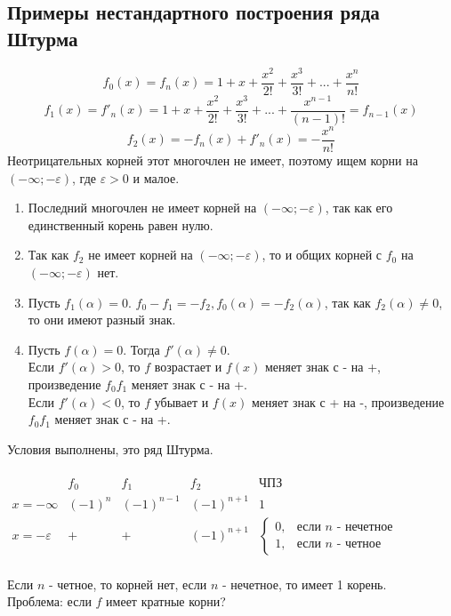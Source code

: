 \documentclass[12pt]{article}
\begin{document}
\subsection{Примеры нестандартного построения ряда Штурма}
$$f_0(x) = f_n(x) = 1 + x + \frac{x^2}{2!} + \frac{x^3}{3!} + ... + \frac{x^n}{n!}$$
$$f_1(x) = f'_n(x) = 1 + x + \frac{x^2}{2!} + \frac{x^3}{3!} + ... + \frac{x^{n-1}}{(n-1)!} = f_{n-1}(x)$$
$$f_2(x) = -f_n(x) + f'_n(x) = -\frac{x^n}{n!}$$
\indent Неотрицательных корней этот многочлен не имеет, поэтому ищем корни на $(-\infty; -\varepsilon)$, где $\varepsilon > 0$ и малое.

\begin{enumerate}
\item Последний многочлен не имеет корней на $(-\infty; -\varepsilon)$, так как его единственный корень равен нулю.
\item Так как $f_2$ не имеет корней на $(-\infty; -\varepsilon)$, то и общих корней с $f_0$ на $(-\infty; -\varepsilon)$ нет.
\item Пусть $f_1(\alpha) = 0$. $f_0 - f_1 = -f_2, f_0(\alpha) = -f_2(\alpha)$, так как $f_2(\alpha) \neq 0$, то они имеют разный знак.
\item  Пусть $f(\alpha) = 0$. Тогда $f'(\alpha) \neq 0$. \\ Если $f'(\alpha) > 0$, то $f$ возрастает и $f(x)$ меняет знак с - на +, произведение $f_0f_1$ меняет знак с - на +. \\ Если $f'(\alpha) < 0$, то $f$ убывает и $f(x)$ меняет знак с + на -, произведение $f_0f_1$ меняет знак с - на +.
\end{enumerate}
\indent Условия выполнены, это ряд Штурма. \\ \\
$\begin{array}{c|c|c|c|c}
  & f_0 & f_1 & f_2 & \textit{ЧПЗ} \\ \hline
x = -\infty & (-1)^n & (-1)^{n-1} & (-1)^{n+1} & 1 \\ \hline
x = -\varepsilon & + & + & (-1)^{n+1} & \begin{cases}
0, & \text{если $n$ - нечетное} \\
1, & \text{если $n$ - четное}
\end{cases}
\end{array}$
\\ \\
\indent Если $n$ - четное, то корней нет, если $n$ - нечетное, то имеет 1 корень. \\
\indent Проблема: если $f$ имеет кратные корни?
\end{document}
